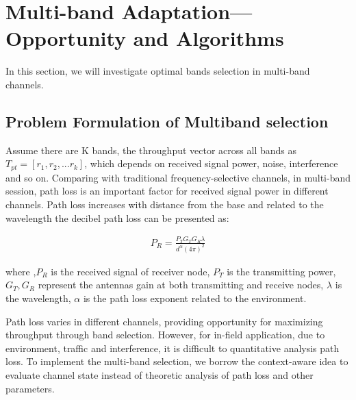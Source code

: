\section{Multi-band Adaptation---Opportunity and Algorithms}
\label{sec:model}
In this section, we will investigate optimal bands selection in multi-band channels. 

\subsection{Problem Formulation of Multiband selection}
\label{subsec:problem}
Assume there are K bands, the throughput vector across all bands as $T_{pt}=[r_1,r_2,...r_k]$, which depends on received signal power, noise, interference and so on. Comparing with traditional frequency-selective channels, in multi-band session, path loss is an important factor for received signal power in different channels. 
Path loss increases with distance from the base and related to the wavelength the decibel path loss can be presented as:\cite{rappaport}

\begin{align}
P_{R}=\frac{P_TG_TG_R\lambda}{d^\alpha(4\pi)^2}
\end{align}

where ,$P_R$ is the received signal of receiver node, $P_T$ is the transmitting power, $G_T,G_R$ represent the antennas gain at both transmitting and receive nodes,
$\lambda$ is the wavelength, $\alpha$ is the path loss exponent related to the environment. 

Path loss varies in different channels, providing opportunity for maximizing throughput through band selection. However, for in-field application, due to environment, traffic and interference, it is difficult to quantitative analysis path loss. To implement the multi-band selection, we borrow the context-aware idea to evaluate channel state instead of theoretic analysis of path loss and other parameters. 

